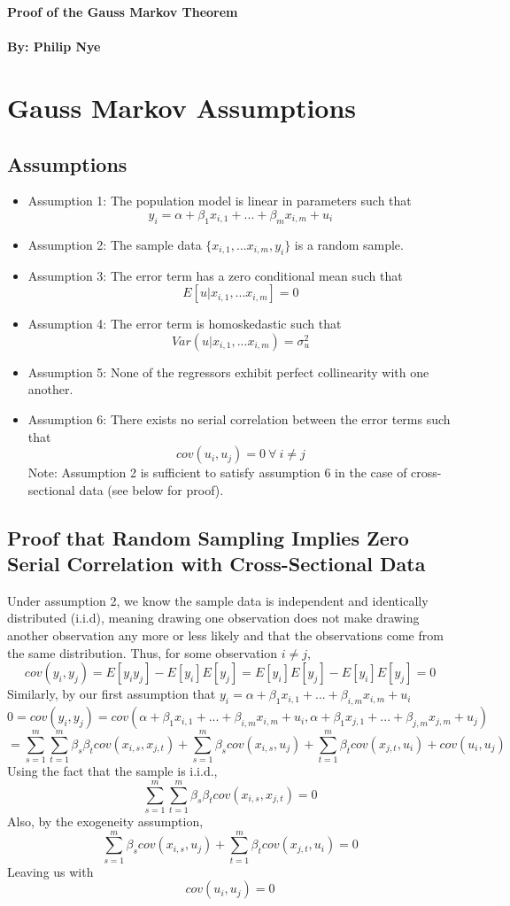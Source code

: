 \documentclass[11pt,letterhead]{article}
\begin{document}
\begin{titlepage}
\begin{centering}
\textbf{\LARGE{Proof of the Gauss Markov Theorem}}\\~\\
\vspace{0.5cm}
\textbf{\Large{By: Philip Nye}}
\tableofcontents
\end{centering}
\end{titlepage}
\newpage
\section{Gauss Markov Assumptions}
\subsection{Assumptions}
\begin{itemize}
\item Assumption 1: The population model is linear in parameters such that $$y_i=\alpha +\beta_1x_{i,1}+...+\beta_mx_{i,m}+u_i$$
\item Assumption 2: The sample data $\{x_{i,1},...x_{i,m},y_i\}$ is a random sample.
\item Assumption 3: The error term has a zero conditional mean such that $$E[u|x_{i,1},...x_{i,m}]=0$$
\item Assumption 4: The error term is homoskedastic such that $$Var(u|x_{i,1},...x_{i,m})=\sigma_u^2$$
\item Assumption 5: None of the regressors exhibit perfect collinearity with one another.
\item Assumption 6: There exists no serial correlation between the error terms such that $$cov(u_i,u_j)=0 \: \forall \: i\neq j$$Note: Assumption 2 is sufficient to satisfy assumption 6 in the case of cross-sectional data (see below for proof).
\end{itemize}
\subsection{Proof that Random Sampling Implies Zero Serial Correlation with Cross-Sectional Data}
Under assumption 2, we know the sample data is independent and identically distributed (i.i.d), meaning drawing one observation does not make drawing another observation any more or less likely and that the observations come from the same distribution. Thus, for some observation $i\neq j$,
$$cov(y_i,y_j)=E[y_i y_j]-E[y_i]E[y_j]=E[y_i]E[y_j]-E[y_i]E[y_j]=0$$
Similarly, by our first assumption that $y_i=\alpha+\beta_1x_{i,1}+...+\beta_{i,m}x_{i,m}+u_i$
$$0=cov(y_i,y_j)=cov(\alpha+\beta_1x_{i,1}+...+\beta_{i,m}x_{i,m}+u_i,\alpha+\beta_1x_{j,1}+...+\beta_{j,m}x_{j,m}+u_j)$$
$$=\sum_{s=1}^m \sum_{t=1}^m \beta_s \beta_t cov(x_{i,s},x_{j,t}) + \sum_{s=1}^m \beta_s cov(x_{i,s},u_j) + \sum_{t=1}^m \beta_t cov(x_{j,t},u_i) + cov(u_i,u_j)$$
Using the fact that the sample is i.i.d., $$\sum_{s=1}^m \sum_{t=1}^m \beta_s \beta_t cov(x_{i,s},x_{j,t})=0$$ Also, by the exogeneity assumption, $$\sum_{s=1}^m \beta_s cov(x_{i,s},u_j) + \sum_{t=1}^m \beta_t cov(x_{j,t},u_i)=0$$ Leaving us with $$cov(u_i,u_j)=0$$
\newpage
\end{document}
